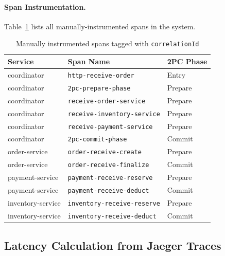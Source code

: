 \paragraph{Span Instrumentation.}
Table~\ref{tab:spans} lists all manually-instrumented spans in the system.

\begin{table}[!ht]
  \caption{Manually instrumented spans tagged with \texttt{correlationId}}
  \label{tab:spans}
  \centering
  \begin{tabular}{lll}
    \toprule
    \textbf{Service} & \textbf{Span Name} & \textbf{2PC Phase} \\
    \midrule
    coordinator       & \texttt{http-receive-order}         & Entry \\
    coordinator       & \texttt{2pc-prepare-phase}          & Prepare \\
    coordinator       & \texttt{receive-order-service}      & Prepare \\
    coordinator       & \texttt{receive-inventory-service}  & Prepare \\
    coordinator       & \texttt{receive-payment-service}    & Prepare \\
    coordinator       & \texttt{2pc-commit-phase}           & Commit \\
    order-service     & \texttt{order-receive-create}       & Prepare \\
    order-service     & \texttt{order-receive-finalize}     & Commit \\
    payment-service   & \texttt{payment-receive-reserve}    & Prepare \\
    payment-service   & \texttt{payment-receive-deduct}     & Commit \\
    inventory-service & \texttt{inventory-receive-reserve}  & Prepare \\
    inventory-service & \texttt{inventory-receive-deduct}   & Commit \\
    \bottomrule
  \end{tabular}
\end{table}

\subsection{Latency Calculation from Jaeger Traces}
\label{subsec:latency-calc}

